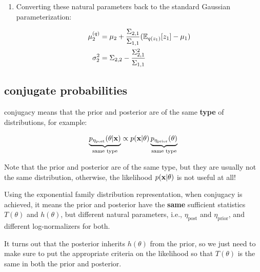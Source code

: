 \documentclass{article}
\begin{document}
\begin{enumerate}
where $\eeta = \big[ \eta_1, \eta_2 \big]$

\item
Converting these natural parameters back to the standard Gaussian parameterization:

\begin{equation}\begin{split}
\mu_2^{(q)} &= \mu_2 + \frac{\Sigma_{2,1}}{\Sigma_{1,1}}(\mathbb{E}_{q(z_1)}[z_1] - \mu_1) \\
\sigma_2^2 &= \Sigma_{2,2} - \frac{\Sigma_{2,1}^2}{\Sigma_{1,1}}
\end{split}\end{equation}

\end{enumerate}





\subsection{conjugate probabilities \optional}

conjugacy means that the prior and posterior are of the same {\bf type } of distributions, for example:


\begin{equation}\begin{split}
\underbrace{p_{\eta_{\text{post}}}(\theta | {\mathbf x})}_{\text{same type}} \propto p({\mathbf x} | \theta)  \underbrace{p_{\eta_{\text{prior}}}(\theta)}_{\text{same type}}
\end{split}\end{equation}


Note that the prior and posterior are of the same type, but they are usually not the same distribution, otherwise, the likelihood $p({\mathbf x} | \theta)$ is not useful at all!

Using the exponential family distribution representation, when conjugacy is achieved, it means the prior and posterior have the {\bf same} sufficient statistics $T(\theta)$ and $h(\theta)$, but different natural parameters, i.e., $\eta_{\text{post}}$ and $\eta_{\text{prior}}$, and different log-normalizers for both.

It turns out that the posterior inherits $h(\theta)$ from the prior, so we just need to make sure to put the appropriate criteria on the likelihood so that $T(\theta)$ is the same in both the prior and posterior.
\end{document}
